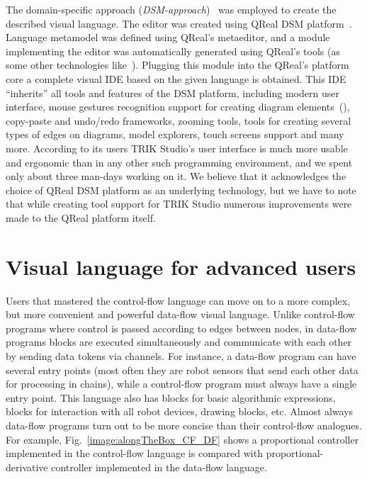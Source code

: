 \documentclass[conference]{IEEEtran}
\begin{document}
The domain-specific approach (\textit{DSM-approach})~\cite{koznov2008} was employed to create the described visual language. The editor was created using QReal DSM platform~\cite{qrealMeta,kuzenkova2013qreal}. Language metamodel was defined using QReal's metaeditor, and a module implementing the editor was automatically generated using QReal's tools (as some other technologies like~\cite{bryksin2011ubiq}). Plugging this module into the QReal's platform core a complete visual IDE based on the given language is obtained. This IDE ``inherits'' all tools and features of the DSM platform, including modern user interface, mouse gestures recognition support for creating diagram elements~(\cite{osechkina2010gestures,osechkina2012multistroke}), copy-paste and undo/redo frameworks, zooming tools, tools for creating several types of edges on diagrams, model explorers, touch screens support and many more. According to its users TRIK Studio's user interface is much more usable and ergonomic than in any other such programming environment, and we spent only about three man-days working on it. We believe that it acknowledges the choice of QReal DSM platform as an underlying technology, but we have to note that while creating tool support for TRIK Studio numerous improvements were made to the QReal platform itself.

\section{Visual language for advanced users}
\label{chapter:dataFlowLanguage}

Users that mastered the control-flow language can move on to a more complex, but more convenient and powerful data-flow visual language. Unlike control-flow programs where control is passed according to edges between nodes, in data-flow programs blocks are executed simultaneously and communicate with each other by sending data tokens via channels. For instance, a data-flow program can have several entry points (most often they are robot sensors that send each other data for processing in chains), while a control-flow program must always have a single entry point. This language also has blocks for basic algorithmic expressions, blocks for interaction with all robot devices, drawing blocks, etc. Almost always data-flow programs turn out to be more concise than their control-flow analogues. For example, Fig.~\ref{image:alongTheBox_CF_DF} shows a proportional controller implemented in the control-flow language is compared with proportional-derivative controller implemented in the data-flow language.
\end{document}
